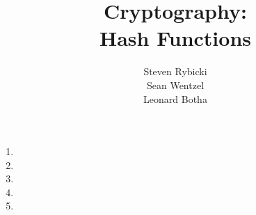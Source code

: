\documentclass[12pt,a4paper]{article}
\title{{\bf Cryptography:}\\
Hash Functions}
\author{Steven Rybicki\\
Sean Wentzel\\
Leonard Botha}
\begin{document}
\maketitle
\begin{enumerate}
\item 
\item 
\item 
\item 
\item 
\end{enumerate}
\end{document}
